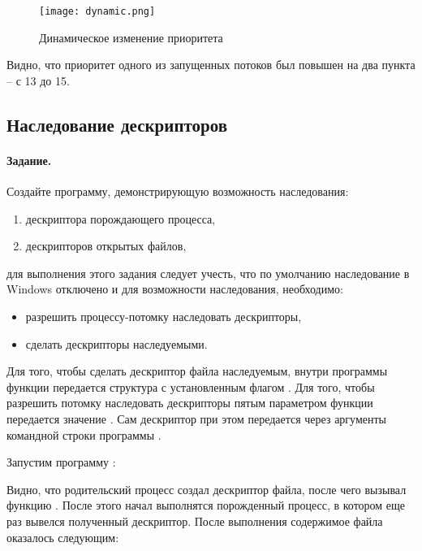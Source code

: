 \begin{figure}[H]
	\centering
	\texttt{[image: dynamic.png]}
	\caption{Динамическое изменение приоритета}
\end{figure}

Видно, что приоритет одного из запущенных потоков был повышен на два пункта -- с 13 до 15.

\subsection{Наследование дескрипторов}

\paragraph{Задание.} Создайте программу, демонстрирующую возможность наследования:

\begin{enumerate}
	\item дескриптора порождающего процесса,
	\item дескрипторов открытых файлов,
\end{enumerate}
для выполнения этого задания следует учесть, что по умолчанию наследование в Windows отключено и для возможности наследования, необходимо:

\begin{itemize}
	\item разрешить процессу-потомку наследовать дескрипторы,
	\item сделать дескрипторы наследуемыми.
\end{itemize}

Для того, чтобы сделать дескриптор файла наследуемым, внутри программы  функции  передается структура  с установленным флагом . Для того, чтобы разрешить потомку наследовать дескрипторы пятым параметром функции  передается значение . Сам дескриптор при этом передается через аргументы командной строки  программы .




Запустим программу :


Видно, что родительский процесс создал дескриптор файла, после чего вызывал функцию . После этого начал выполнятся порожденный процесс, в котором еще раз вывелся полученный дескриптор. После выполнения содержимое файла  оказалось следующим:


